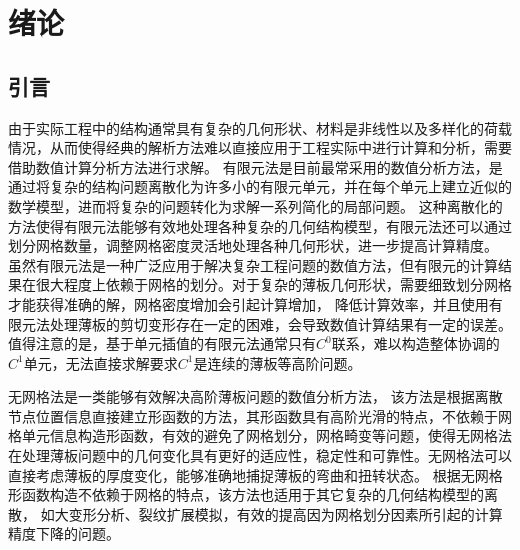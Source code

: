 \chapter{绪论}
\section{引言}
由于实际工程中的结构通常具有复杂的几何形状、材料是非线性以及多样化的荷载情况，从而使得经典的解析方法难以直接应用于工程实际中进行计算和分析，需要借助数值计算分析方法进行求解。
有限元法\textsuperscript{\cite{hughes2000,2014Computer,steinEncyclopediaComputationalMechanics2018,2013Nonlinear}}是目前最常采用的数值分析方法，是通过将复杂的结构问题离散化为许多小的有限元单元，并在每个单元上建立近似的数学模型，进而将复杂的问题转化为求解一系列简化的局部问题。
这种离散化的方法使得有限元法能够有效地处理各种复杂的几何结构模型，有限元法还可以通过划分网格数量，调整网格密度灵活地处理各种几何形状，进一步提高计算精度。
虽然有限元法是一种广泛应用于解决复杂工程问题的数值方法，但有限元的计算结果在很大程度上依赖于网格的划分。对于复杂的薄板几何形状，需要细致划分网格才能获得准确的解，网格密度增加会引起计算增加， 降低计算效率，并且使用有限元法处理薄板的剪切变形存在一定的困难，会导致数值计算结果有一定的误差。
值得注意的是，基于单元插值的有限元法通常只有$C^0$联系，难以构造整体协调的$C^1$单元，无法直接求解要求$C^1$是连续的薄板等高阶问题。
\par
无网格法\textsuperscript{\cite{chenMeshfreeMethodsProgress2017,belytschkoMeshlessMethodsOverview1996b}}是一类能够有效解决高阶薄板问题的数值分析方法，
该方法是根据离散节点位置信息直接建立形函数的方法，其形函数具有高阶光滑的特点，不依赖于网格单元信息构造形函数，有效的避免了网格划分，网格畸变等问题，使得无网格法在处理薄板问题\textsuperscript{\cite{邓立克2019薄板分析的线性基梯度光滑伽辽金无网格法}}中的几何变化具有更好的适应性，稳定性和可靠性。无网格法可以直接考虑薄板的厚度变化，能够准确地捕捉薄板的弯曲和扭转状态。
根据无网格形函数构造不依赖于网格的特点，该方法也适用于其它复杂的几何结构模型的离散，
如大变形分析\textsuperscript{\cite{陈嵩涛2020几何非线性分析的高效高阶无网格法}}、裂纹扩展模拟\textsuperscript{\cite{GaoXin2018}}，有效的提高因为网格划分因素所引起的计算精度下降的问题。
